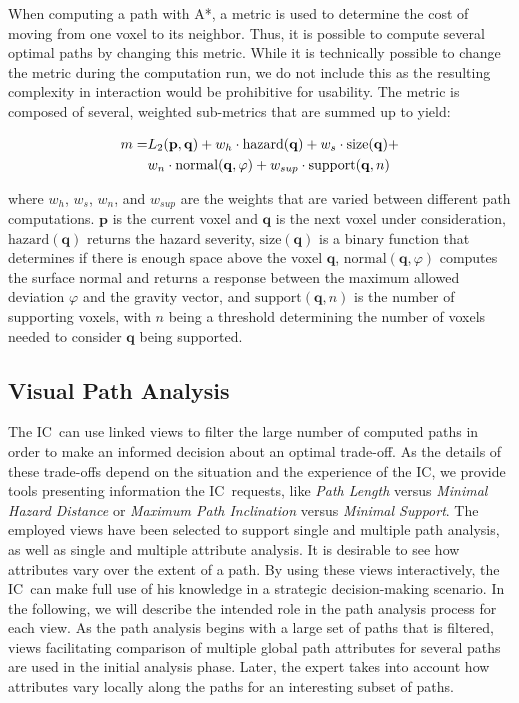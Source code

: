 \documentclass{egpubl}
\def\IC{IC}
\begin{document}
When computing a path with A*, a metric is used to determine the cost of moving from one voxel to its neighbor. Thus, it is possible to compute several optimal paths by changing this metric. While it is technically possible to change the metric during the computation run, we do not include this as the resulting complexity in interaction would be prohibitive for usability. The metric is composed of several, weighted sub-metrics that are summed up to yield:

\begin{equation}
\begin{array}{r@{}l}
m = & L_2(\mathbf{p},\mathbf{q}) + w_h \cdot \textrm{hazard}(\mathbf{q}) + w_s \cdot \textrm{size}(\mathbf{q}) + \vspace*{0.1cm} \\
  & w_n \cdot \textrm{normal}(\mathbf{q},\varphi) + w_{sup} \cdot \textrm{support}(\mathbf{q},n)
\end{array}
\end{equation}

\noindent where $w_h$, $w_s$, $w_n$, and $w_{sup}$ are the weights that are varied between different path computations. $\mathbf{p}$ is the current voxel and $\mathbf{q}$ is the next voxel under consideration, $\textrm{hazard}(\mathbf{q})$ returns the hazard severity, $\textrm{size}(\mathbf{q})$ is a binary function that determines if there is enough space above the voxel $\mathbf{q}$, $\textrm{normal}(\mathbf{q},\varphi)$ computes the surface normal and returns a response between the maximum allowed deviation $\varphi$ and the gravity vector, and $\mathrm{support}(\mathbf{q},n)$ is the number of supporting voxels, with $n$ being a threshold determining the number of voxels needed to consider $\mathbf{q}$ being supported.

\subsection{Visual Path Analysis} \label{sec:overview:pathanalysis}
The \IC\ can use linked views to filter the large number of computed paths in order to make an informed decision about an optimal trade-off. As the details of these trade-offs depend on the situation and the experience of the \IC, we provide tools presenting information the \IC\ requests, like \emph{Path Length} versus \emph{Minimal Hazard Distance} or \emph{Maximum Path Inclination} versus \emph{Minimal Support}. The employed views have been selected to support single and multiple path analysis, as well as single and multiple attribute analysis. It is desirable to see how attributes vary over the extent of a path. By using these views interactively, the \IC\ can make full use of his knowledge in a strategic decision-making scenario. In the following, we will describe the intended role in the path analysis process for each view. As the path analysis begins with a large set of paths that is filtered, views facilitating comparison of multiple global path attributes for several paths are used in the initial analysis phase. Later, the expert takes into account how attributes vary locally along the paths for an interesting subset of paths.
\end{document}
